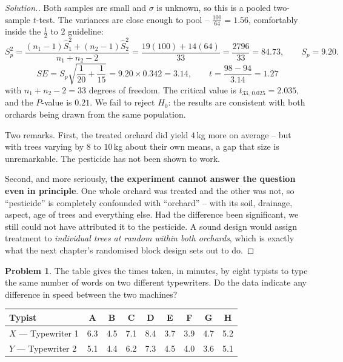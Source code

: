 \documentclass[11pt,a4paper]{article}
\theoremstyle{definition}
\newtheorem{problemx}{Problem}[section]
\newenvironment{problem}{\begin{problemx}}{\end{problemx}}
\newenvironment{solution}
  {\renewcommand{\qedsymbol}{}\begin{proof}[\textit{Solution}.]}
  {\end{proof}}
\begin{document}
\begin{solution}
Both samples are small and $\sigma$ is unknown, so this is a pooled two-sample $t$-test. The
variances are close enough to pool -- $\tfrac{100}{64}=1.56$, comfortably inside the
$\tfrac12$ to $2$ guideline:
\[S_p^2=\frac{(n_1-1)\hat{S}_1^2+(n_2-1)\hat{S}_2^2}{n_1+n_2-2}
=\frac{19(100)+14(64)}{33}=\frac{2796}{33}=84.73, \qquad S_p=9.20.\]
\[SE=S_p\sqrt{\frac{1}{20}+\frac{1}{15}}=9.20\times 0.342=3.14,
\qquad t=\frac{98-94}{3.14}=1.27\]
with $n_1+n_2-2=33$ degrees of freedom. The critical value is $t_{33,\,0.025}=2.035$, and
the $P$-value is $0.21$. We fail to reject $H_0$: the results are consistent with both
orchards being drawn from the same population.

\medskip
Two remarks. First, the treated orchard did yield $4$\,kg more on average -- but with trees
varying by $8$ to $10$\,kg about their own means, a gap that size is unremarkable. The
pesticide has not been shown to work.

Second, and more seriously, \textbf{the experiment cannot answer the question even in
principle}. One whole orchard was treated and the other was not, so ``pesticide'' is
completely confounded with ``orchard'' -- with its soil, drainage, aspect, age of trees and
everything else. Had the difference been significant, we still could not have attributed it
to the pesticide. A sound design would assign treatment to \emph{individual trees at random
within both orchards}, which is exactly what the next chapter's randomised block design
sets out to do.
\end{solution}

\begin{problem}
The table gives the times taken, in minutes, by eight typists to type the same number of
words on two different typewriters. Do the data indicate any difference in speed between the
two machines?
\begin{table}[H]
\centering
\begin{tabular}{l|cccccccc}
Typist & A & B & C & D & E & F & G & H\\
\hline
$X$ --- Typewriter 1 & 6.3 & 4.5 & 7.1 & 8.4 & 3.7 & 3.9 & 4.7 & 5.2\\
$Y$ --- Typewriter 2 & 5.1 & 4.4 & 6.2 & 7.3 & 4.5 & 4.0 & 3.6 & 5.1\\
\end{tabular}
\end{table}
\end{problem}
\end{document}
